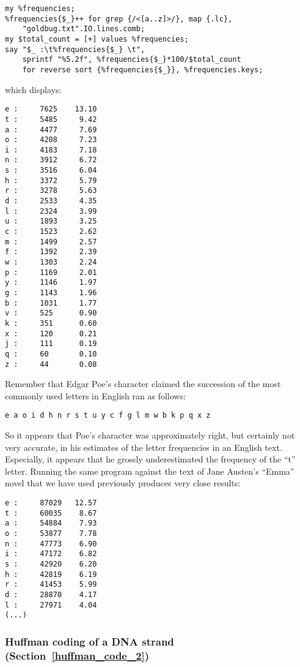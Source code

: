 \begin{verbatim}
my %frequencies;
%frequencies{$_}++ for grep {/<[a..z]>/}, map {.lc}, 
    "goldbug.txt".IO.lines.comb;
my $total_count = [+] values %frequencies;
say "$_ :\t%frequencies{$_} \t", 
    sprintf "%5.2f", %frequencies{$_}*100/$total_count  
    for reverse sort {%frequencies{$_}}, %frequencies.keys;
\end{verbatim}   

which displays:
\begin{verbatim}
e :     7625    13.10
t :     5485     9.42
a :     4477     7.69
o :     4208     7.23
i :     4183     7.18
n :     3912     6.72
s :     3516     6.04
h :     3372     5.79
r :     3278     5.63
d :     2533     4.35
l :     2324     3.99
u :     1893     3.25
c :     1523     2.62
m :     1499     2.57
f :     1392     2.39
w :     1303     2.24
p :     1169     2.01
y :     1146     1.97
g :     1143     1.96
b :     1031     1.77
v :     525      0.90
k :     351      0.60
x :     120      0.21
j :     111      0.19
q :     60       0.10
z :     44       0.08
\end{verbatim}

Remember that Edgar Poe's character claimed the succession 
of the most commonly used letters in English ran as 
follows:

\begin{verbatim}
e a o i d h n r s t u y c f g l m w b k p q x z
\end{verbatim}

So it appears that Poe's character was approximately 
right, but certainly not very accurate, in his estimates of the 
letter frequencies in an English text. Especially, it appears 
that he grossly underestimated the frequency of the ``t'' letter. 
Running the same program against the text of Jane Austen's 
``Emma'' novel that we have used previously produces very 
close results:

\begin{verbatim}
e :     87029   12.57
t :     60035    8.67
a :     54884    7.93
o :     53877    7.78
n :     47773    6.90
i :     47172    6.82
s :     42920    6.20
h :     42819    6.19
r :     41453    5.99
d :     28870    4.17
l :     27971    4.04
(...)
\end{verbatim}

\subsubsection{Huffman coding of a DNA strand (Section~\ref{huffman_code_2})}
\label{sol_huffman_code_2}

